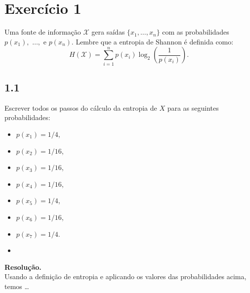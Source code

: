 \documentclass[12pt,letterpaper]{article}
\newcommand\answer{\textbf{Resolução.}\xspace}
\begin{document}
\section*{Exercício 1}

Uma fonte de informação $\mathcal{X}$ gera saídas $\{ x_1, \ldots, x_n\}$
com as probabilidades $p(x_1),$ $\ldots,$ e $p(x_n)$.
Lembre que a entropia de Shannon é definida como:
\[
    H \left( \mathcal{X} \right) = \sum_{i = 1}^{n} p(x_i) \log_2 \left( \frac{1}{p(x_i)} \right).
\]

\subsection*{1.1}
Escrever todos os passos do cálculo da entropia de $X$ para as seguintes probabilidades:
\begin{multicols}{3} %
  \begin{itemize}
    \item $p(x_1) = 1/4$,
    \item $p(x_2) = 1/16$,
    \item $p(x_3) = 1/16$,
    \item $p(x_4) = 1/16$,
    \item $p(x_5) = 1/4$,
    \item $p(x_6) = 1/16$,
    \item $p(x_7) = 1/4$.
    \item[\vspace{\fill}] %
  \end{itemize}
\end{multicols} %


\answer \\
Usando a definição de entropia e aplicando os valores das probabilidades acima,
temos \ldots
\end{document}
